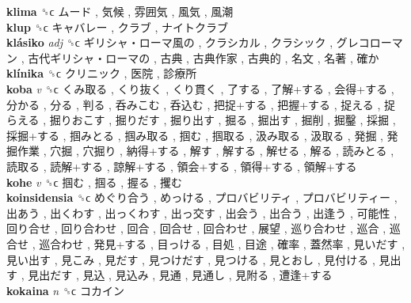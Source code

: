 \textbf{klima} ␝ϲ   ムード ,  気候 ,  雰囲気 ,  風気 ,  風潮   \\
\textbf{klup} ␝ϲ   キャバレー ,  クラブ ,  ナイトクラブ   \\
\textbf{klásiko} \emph{adj}  ␝ϲ   ギリシャ・ローマ風の ,  クラシカル ,  クラシック ,  グレコローマン ,  古代ギリシャ・ローマの ,  古典 ,  古典作家 ,  古典的 ,  名文 ,  名著 ,  確か   \\
\textbf{klínika} ␝ϲ   クリニック ,  医院 ,  診療所   \\
\textbf{koba} \emph{v}  ␝ϲ   くみ取る ,  くり抜く ,  くり貫く ,  了する ,  了解+する ,  会得+する ,  分かる ,  分る ,  判る ,  呑みこむ ,  呑込む ,  把捉+する ,  把握+する ,  捉える ,  捉らえる ,  掘りおこす ,  掘りだす ,  掘り出す ,  掘る ,  掘出す ,  掘削 ,  掘鑿 ,  採掘 ,  採掘+する ,  掴みとる ,  掴み取る ,  掴む ,  掴取る ,  汲み取る ,  汲取る ,  発掘 ,  発掘作業 ,  穴掘 ,  穴掘り ,  納得+する ,  解す ,  解する ,  解せる ,  解る ,  読みとる ,  読取る ,  読解+する ,  諒解+する ,  領会+する ,  領得+する ,  領解+する   \\
\textbf{kohe} \emph{v}  ␝ϲ   掴む ,  掴る ,  握る ,  攫む   \\
\textbf{koinsidensia} ␝ϲ   めぐり合う ,  めっける ,  プロバビリティ ,  プロバビリティー ,  出あう ,  出くわす ,  出っくわす ,  出っ交す ,  出会う ,  出合う ,  出逢う ,  可能性 ,  回り合せ ,  回り合わせ ,  回合 ,  回合せ ,  回合わせ ,  展望 ,  巡り合わせ ,  巡合 ,  巡合せ ,  巡合わせ ,  発見+する ,  目っける ,  目処 ,  目途 ,  確率 ,  蓋然率 ,  見いだす ,  見い出す ,  見こみ ,  見だす ,  見つけだす ,  見つける ,  見とおし ,  見付ける ,  見出す ,  見出だす ,  見込 ,  見込み ,  見通 ,  見通し ,  見附る ,  遭逢+する   \\
\textbf{kokaina} \emph{n}  ␝ϲ   コカイン   \\
